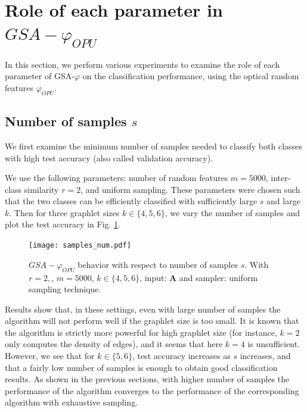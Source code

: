 \section{Role of each parameter in $GSA-\varphi_{OPU}$}

In this section, we perform various experiments to examine the role of each parameter of GSA-$\varphi$ on the classification performance, using the optical random features $\varphi_{OPU}$.

\subsection{Number of samples $s$}
We first examine the minimum number of samples needed to classify both classes with high test accuracy (also called validation accuracy).

We use the following parameters: number of random features $m=5000$, inter-class similarity $r=2$, and uniform sampling. These parameters were chosen such that the two classes can be efficiently classified with sufficiently large $s$ and large $k$. Then for three graphlet sizes $k\in\{4,5,6\}$, we vary the number of samples and plot the test accuracy in Fig. \ref{fig:varying_samples_num}.

\begin{figure}[H]
\centering
\texttt{[image: samples\_num.pdf]}
\caption[$GSA-\varphi_{OPU}$ behavior with respect to number of samples $s$]{$GSA-\varphi_{OPU}$ behavior with respect to number of samples $s$. With $r=2,$, $m=5000$, $k\in\{4,5,6\}$, input: $\mathbf{A}$ and sampler: uniform sampling technique.}
\label{fig:varying_samples_num}
\end{figure}
Results show that, in these settings, even with large number of samples the algorithm will not perform well if the graphlet size is too small. It is known that the algorithm is strictly more powerful for high graphlet size (for instance, $k=2$ only computes the density of edges), and it seems that here $k=4$ is unsufficient. %
However, we see that for $k\in\{5,6\}$, test accuracy increases as $s$ increases, and that a fairly low number of samples is enough to obtain good classification results. As shown in the previous sections, with higher number of samples the performance of the algorithm converges to the performance of the corresponding algorithm with exhaustive sampling.

